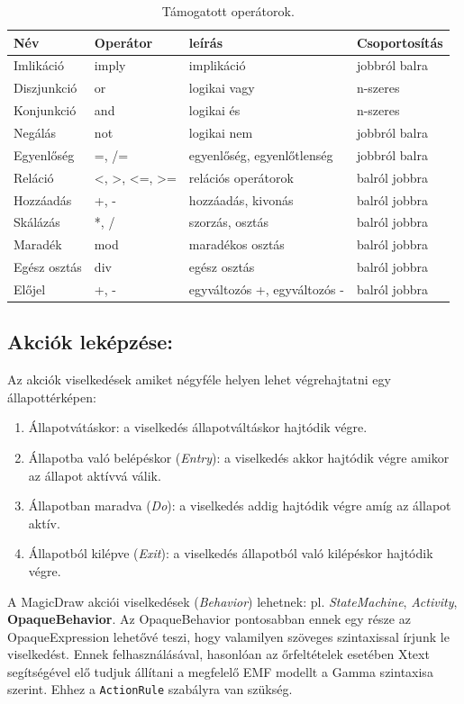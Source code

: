 \begin{table}[!h]
	\footnotesize
	\centering
	\begin{tabular}{ l l l l }
		Név & Operátor& leírás & Csoportosítás \\ \hline
		 Imlikáció & imply & implikáció & jobbról balra \\
		 Diszjunkció & or & logikai vagy & n-szeres\\
		 Konjunkció & and & logikai és & n-szeres \\
		 Negálás & not & logikai nem & jobbról balra \\
		 Egyenlőség & =, /= & egyenlőség, egyenlőtlenség & jobbról balra \\
		 Reláció & <, >, <=, >= & relációs operátorok & balról jobbra \\  
		 Hozzáadás & +, - & hozzáadás, kivonás & balról jobbra \\
		 Skálázás & *, / & szorzás, osztás & balról jobbra \\
		 Maradék & mod & maradékos osztás & balról jobbra \\
		 Egész osztás & div & egész osztás & balról jobbra \\
		 Előjel & +, - & egyváltozós +, egyváltozós - & balról jobbra
	\end{tabular}
	\caption{Támogatott operátorok.}
	\label{table:operators}
\end{table}


\subsection{Akciók leképzése:}
Az akciók viselkedések amiket négyféle helyen lehet végrehajtatni egy állapottérképen:

\begin{enumerate}
	\item Állapotvátáskor: a viselkedés állapotváltáskor hajtódik végre.
	\item Állapotba való belépéskor (\emph{Entry}): a viselkedés akkor hajtódik végre amikor az állapot aktívvá válik.
	\item Állapotban maradva (\emph{Do}): a viselkedés addig hajtódik végre amíg az állapot aktív.
	\item Állapotból kilépve (\emph{Exit}): a viselkedés állapotból való kilépéskor hajtódik végre.
\end{enumerate}

A MagicDraw akciói viselkedések (\emph{Behavior}) lehetnek: pl. \emph{StateMachine}, \emph{Activity}, \textbf{OpaqueBehavior}. Az OpaqueBehavior pontosabban ennek egy része az OpaqueExpression lehetővé teszi, hogy valamilyen szöveges szintaxissal írjunk le viselkedést. Ennek felhasználásával, hasonlóan az őrfeltételek esetében Xtext segítségével elő tudjuk állítani a megfelelő EMF modellt a Gamma szintaxisa szerint. Ehhez a \verb+ActionRule+ szabályra van szükség.


